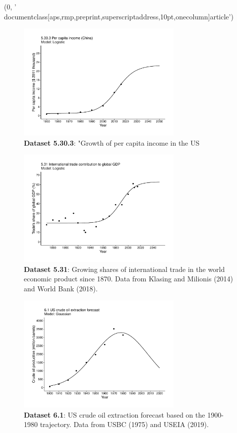 (0, '\\documentclass[aps,rmp,preprint,superscriptaddress,10pt,onecolumn]{article}\n')
\begin{document}
\begin{figure}[h]
\includegraphics[width=8cm]{output/figs-ggplot/5.30.3.pdf}
\caption{\textbf{Dataset 5.30.3}: "Growth of per capita income in the US}
\end{figure}
	
\begin{figure}[h]
\includegraphics[width=8cm]{output/figs-ggplot/5.31.pdf}
\caption{\textbf{Dataset 5.31}: Growing shares of international trade in the world economic product since 1870. Data from Klasing and Milionis (2014) and World Bank (2018).}
\end{figure}
	
\begin{figure}[h]
\includegraphics[width=8cm]{output/figs-ggplot/6.1.pdf}
\caption{\textbf{Dataset 6.1}: US crude oil extraction forecast based on the 1900-1980 trajectory. Data from USBC (1975) and USEIA (2019). }
\end{figure}
	
\end{document}
